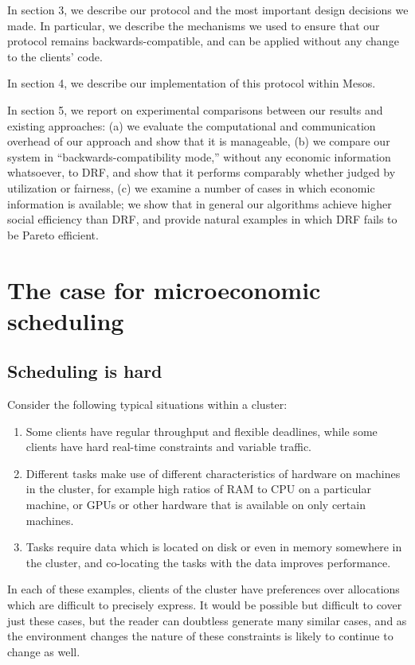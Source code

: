 \documentclass{acm_proc_article-sp}
\begin{document}
In section 3, we describe our protocol and the most important design decisions
we made. In particular, we describe the mechanisms we used to ensure that our
protocol remains backwards-compatible, and can be applied without any change to
the clients’ code.

In section 4, we describe our implementation of this protocol within Mesos. 

In section 5, we report on experimental comparisons between our results and
existing approaches: (a) we evaluate the computational and communication
overhead of our approach and show that it is manageable, (b) we compare our
system in ``backwards-compatibility mode,'' without any economic information
whatsoever, to DRF, and show that it performs comparably whether judged by
utilization or fairness, (c) we examine a number of cases in which economic
information is available; we show that in general our algorithms achieve higher
social efficiency than DRF, and provide natural examples in which DRF fails to
be Pareto efficient.

\section{The case for microeconomic scheduling}
\subsection{Scheduling is hard}
Consider the following typical situations within a cluster:
\begin{enumerate}
  \item Some clients have regular throughput and flexible deadlines, while some
    clients have hard real-time constraints and variable traffic.
  \item Different tasks make use of different characteristics of hardware on
    machines in the cluster, for example high ratios of RAM to CPU on a
    particular machine, or GPUs or other hardware that is available on only
    certain machines.
  \item Tasks require data which is located on disk or even in memory somewhere
    in the cluster, and co-locating the tasks with the data improves
    performance.
\end{enumerate}
In each of these examples, clients of the cluster have preferences over
allocations which are difficult to precisely express. It would be possible but
difficult to cover just these cases, but the reader can doubtless generate many
similar cases, and as the environment changes the nature of these constraints is
likely to continue to change as well. 
\end{document}
